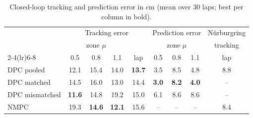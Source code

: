 \begin{table}[!t]
\caption{Closed-loop tracking and prediction error in cm (mean over 30 laps; best per column in bold).}
\label{tab:tracking}
\centering
\setlength{\tabcolsep}{3.2pt}
\begin{tabular}{l cccc ccc c}
\toprule
 & \multicolumn{4}{c}{Tracking error} & \multicolumn{3}{c}{Prediction error} & Nürburgring \\
 & \multicolumn{3}{c}{zone $\mu$} & & \multicolumn{3}{c}{zone $\mu$} & tracking \\
\cmidrule(lr){2-4}\cmidrule(lr){6-8}
 & 0.5 & 0.8 & 1.1 & lap & 0.5 & 0.8 & 1.1 & lap \\
\midrule
DPC pooled & 12.1 & 15.4 & 14.0 & \textbf{13.7} & 3.5 & 8.5 & 4.8 & 8.8 \\
DPC matched & 14.5 & 16.0 & 13.0 & 14.4 & \textbf{3.0} & \textbf{8.2} & \textbf{4.0} & -- \\
DPC mismatched & \textbf{11.6} & 14.8 & 19.2 & 15.0 & 6.1 & 8.6 & 8.6 & -- \\
NMPC & 19.3 & \textbf{14.6} & \textbf{12.1} & 15.6 & -- & -- & -- & 8.4 \\
\bottomrule
\end{tabular}
\end{table}
